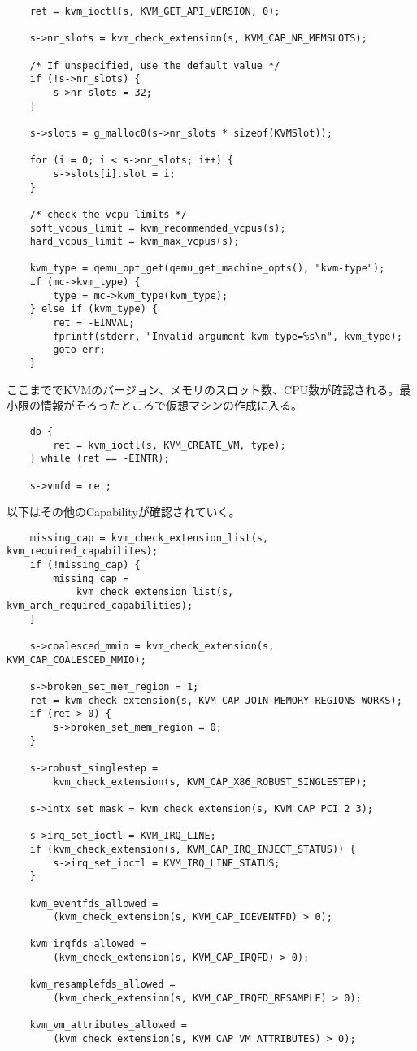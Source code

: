 \documentclass[9pt,b5paper,tombo]{jsbook}
\begin{document}
\begin{lstlisting}
    ret = kvm_ioctl(s, KVM_GET_API_VERSION, 0);

    s->nr_slots = kvm_check_extension(s, KVM_CAP_NR_MEMSLOTS);

    /* If unspecified, use the default value */
    if (!s->nr_slots) {
        s->nr_slots = 32;
    }

    s->slots = g_malloc0(s->nr_slots * sizeof(KVMSlot));

    for (i = 0; i < s->nr_slots; i++) {
        s->slots[i].slot = i;
    }

    /* check the vcpu limits */
    soft_vcpus_limit = kvm_recommended_vcpus(s);
    hard_vcpus_limit = kvm_max_vcpus(s);

    kvm_type = qemu_opt_get(qemu_get_machine_opts(), "kvm-type");
    if (mc->kvm_type) {
        type = mc->kvm_type(kvm_type);
    } else if (kvm_type) {
        ret = -EINVAL;
        fprintf(stderr, "Invalid argument kvm-type=%s\n", kvm_type);
        goto err;
    }
\end{lstlisting}

ここまででKVMのバージョン、メモリのスロット数、CPU数が確認される。最小限の情報がそろったところで仮想マシンの作成に入る。

\begin{lstlisting}
    do {
        ret = kvm_ioctl(s, KVM_CREATE_VM, type);
    } while (ret == -EINTR);

    s->vmfd = ret;
\end{lstlisting}

以下はその他のCapabilityが確認されていく。

\begin{lstlisting}
    missing_cap = kvm_check_extension_list(s, kvm_required_capabilites);
    if (!missing_cap) {
        missing_cap =
            kvm_check_extension_list(s, kvm_arch_required_capabilities);
    }

    s->coalesced_mmio = kvm_check_extension(s, KVM_CAP_COALESCED_MMIO);

    s->broken_set_mem_region = 1;
    ret = kvm_check_extension(s, KVM_CAP_JOIN_MEMORY_REGIONS_WORKS);
    if (ret > 0) {
        s->broken_set_mem_region = 0;
    }

    s->robust_singlestep =
        kvm_check_extension(s, KVM_CAP_X86_ROBUST_SINGLESTEP);

    s->intx_set_mask = kvm_check_extension(s, KVM_CAP_PCI_2_3);

    s->irq_set_ioctl = KVM_IRQ_LINE;
    if (kvm_check_extension(s, KVM_CAP_IRQ_INJECT_STATUS)) {
        s->irq_set_ioctl = KVM_IRQ_LINE_STATUS;
    }

    kvm_eventfds_allowed =
        (kvm_check_extension(s, KVM_CAP_IOEVENTFD) > 0);

    kvm_irqfds_allowed =
        (kvm_check_extension(s, KVM_CAP_IRQFD) > 0);

    kvm_resamplefds_allowed =
        (kvm_check_extension(s, KVM_CAP_IRQFD_RESAMPLE) > 0);

    kvm_vm_attributes_allowed =
        (kvm_check_extension(s, KVM_CAP_VM_ATTRIBUTES) > 0);
\end{lstlisting}
\end{document}
